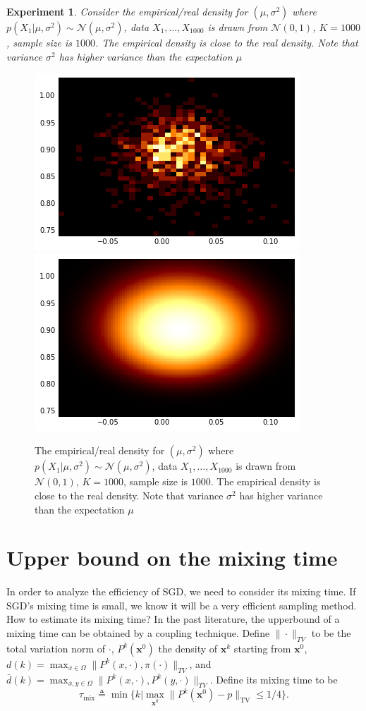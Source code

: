 \documentclass[preprint,12pt,3p]{elsarticle}
\newcommand{\bx}{\mathbf{x}}
\newcommand{\N}{\mathscr{N}}
\newtheorem{experiment}{Experiment}
\begin{document}
\begin{experiment}
Consider the empirical/real density for $(\mu, \sigma^2)$ where $p(X_1|\mu, \sigma^2)\sim \N(\mu, \sigma^2)$, data $X_1,\ldots, X_{1000}$ is drawn from $\N(0, 1)$, $K = 1000$, sample size is $1000$. The empirical density is close to the real density. Note that variance $\sigma^2$ has higher variance than the expectation $\mu$
\end{experiment}
\begin{figure}
\includegraphics[width=0.5\linewidth]{../figure/simulation2_empirical.png}
\includegraphics[width=0.5\linewidth]{../figure/simulation2_real.png}
\caption{The empirical/real density for $(\mu, \sigma^2)$ where $p(X_1|\mu, \sigma^2)\sim \N(\mu, \sigma^2)$, data $X_1,\ldots, X_{1000}$ is drawn from $\N(0, 1)$, $K = 1000$, sample size is $1000$. The empirical density is close to the real density. Note that variance $\sigma^2$ has higher variance than the expectation $\mu$}
\end{figure}
\section{Upper bound on the mixing time} %
\label{sec:upper_bound_on_the_mixing_time}
In order to analyze the efficiency of SGD, we need to consider its mixing time. If SGD's mixing time is small, we know it will be a very efficient sampling method. How to estimate its mixing time? In the past literature, the upperbound of a mixing time can be obtained by a coupling technique. Define $\|\cdot\|_{TV}$ to be the total variation norm of $\cdot$, $P^k(\bx^0)$ the density of $\bx^k$ starting from $\bx^0$, $d(k) = \max_{x\in \Omega} \|P^k(x, \cdot), \pi(\cdot)\|_{TV}$, and $\bar{d}(k) = \max_{x,y\in \Omega} \|P^k(x, \cdot), P^k(y,\cdot)\|_{TV}$.
Define its mixing time to be
\[
\tau_{\mathrm{mix}} \triangleq \min\{k|\max_{\bx^0}\|P^k(\bx^0) - p\|_{\mathrm{TV}}\leq 1/4\}.
\]
\end{document}
